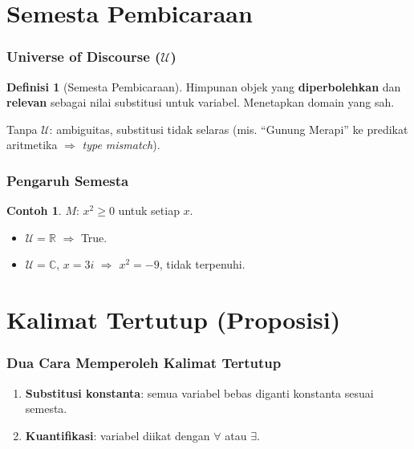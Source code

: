 \documentclass[handout]{beamer}
\theoremstyle{definition}
\newtheorem{definisi}[theorem]{Definisi}
\theoremstyle{example}
\newtheorem{contoh}[theorem]{Contoh}
\begin{document}
\section{Semesta Pembicaraan}

\begin{frame}
\frametitle{Universe of Discourse ($\mathcal{U}$)}
\begin{definisi}[Semesta Pembicaraan]
Himpunan objek yang \textbf{diperbolehkan} dan \textbf{relevan} sebagai nilai substitusi untuk variabel. Menetapkan domain yang sah.
\end{definisi}
Tanpa $\mathcal{U}$: ambiguitas, substitusi tidak selaras (mis. ``Gunung Merapi'' ke predikat aritmetika $\Rightarrow$ \textit{type mismatch}).
\end{frame}

\begin{frame}
\frametitle{Pengaruh Semesta}
\begin{contoh}
$M$: $x^2 \geq 0$ untuk setiap $x$.
\begin{itemize}
  \item $\mathcal{U} = \mathbb{R}$ $\Rightarrow$ True.
  \item $\mathcal{U} = \mathbb{C}$, $x = 3i$ $\Rightarrow$ $x^2 = -9$, tidak terpenuhi.
\end{itemize}
\end{contoh}
\end{frame}

\section{Kalimat Tertutup (Proposisi)}

\begin{frame}
\frametitle{Dua Cara Memperoleh Kalimat Tertutup}
\begin{enumerate}
  \item \textbf{Substitusi konstanta}: semua variabel bebas diganti konstanta sesuai semesta.
  \item \textbf{Kuantifikasi}: variabel diikat dengan $\forall$ atau $\exists$.
\end{enumerate}
\end{frame}
\end{document}
